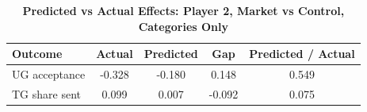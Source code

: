 \begin{table}[!htbp]
\centering
\caption{\textbf{Predicted vs Actual Effects: Player 2, Market vs Control, Categories Only}}
\label{tab:cats_only_market_vs_control_fullpooled_p2_fit}
\begin{tabular}{lcccc}
\toprule
Outcome & Actual & Predicted & Gap & Predicted / Actual \\
\midrule
UG acceptance & -0.328 & -0.180 & 0.148 & 0.549 \\
TG share sent & 0.099 & 0.007 & -0.092 & 0.075 \\
\bottomrule
\end{tabular}
\end{table}
